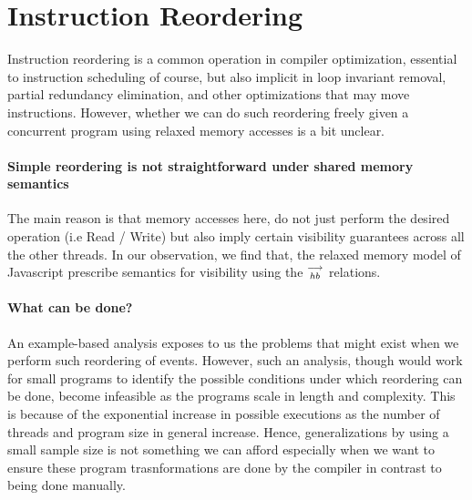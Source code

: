 


\section{Instruction Reordering}
    Instruction reordering is a common operation in compiler optimization, essential to instruction scheduling of course, but also implicit in loop invariant removal, partial redundancy elimination, and other optimizations that may move instructions. 
    However, whether we can do such reordering freely given a concurrent program using relaxed memory accesses is a bit unclear. 
     
    
    \paragraph{Simple reordering is not straightforward under shared memory semantics}
    The main reason is that memory accesses here, do not just perform the desired operation (i.e Read / Write) but also imply certain visibility guarantees across all the other threads.  
    In our observation, we find that, the relaxed memory model of Javascript prescribe semantics for visibility using the $\stackrel{\longrightarrow}{_{hb}}$ relations. 
    
    
    \paragraph{What can be done?}
    An example-based analysis exposes to us the problems that might exist when we perform such reordering of events. 
    However, such an analysis, though would work for small programs to identify the possible conditions under which reordering can be done, become infeasible as the programs scale in length and complexity. 
    This is because of the exponential increase in possible executions as the number of threads and program size in general increase. 
    Hence,  generalizations by using a small sample size is not something we can afford especially when we want to ensure these program trasnformations are done by the compiler in contrast to being done manually.
    
